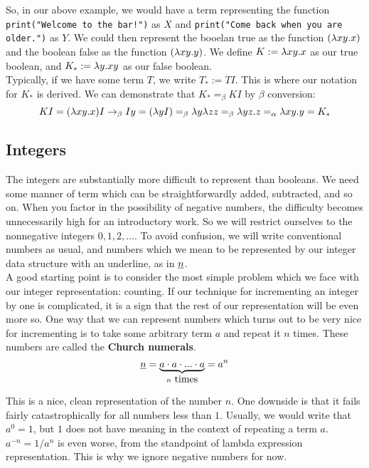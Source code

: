 So, in our above example, we would have a term representing the function \texttt{print("Welcome to the bar!")} as $X$ and \texttt{print("Come back when you are older.")} as $Y$. We could then represent the booelan true as the function $(\lambda xy.x)$ and the boolean false as the function $(\lambda xy.y)$. We define $K := \lambda xy.x$ as our true boolean, and $K_* := \lambda y.xy$ as our false boolean.\\

Typically, if we have some term $T$, we write $T_* := TI$. This is where our notation for $K_*$ is derived. We can demonstrate that $K_* =_\beta KI$ by $\beta$ conversion:
\begin{equation*}
  KI = (\lambda xy.x)I \rightarrow_\beta Iy = (\lambda yI) =_\beta \lambda y\lambda zz =_\beta \lambda yz.z =_\alpha \lambda xy.y = K_*
\end{equation*}

\subsection{Integers}
The integers are substantially more difficult to represent than booleans. We need some manner of term which can be straightforwardly added, subtracted, and so on. When you factor in the possibility of negative numbers, the difficulty becomes unnecessarily high for an introductory work. So we will restrict ourselves to the nonnegative integers $0,1,2,\ldots$. To avoid confusion, we will write conventional numbers as usual, and numbers which we mean to be represented by our integer data structure with an underline, as in $\uline{n}$.\\

A good starting point is to consider the most simple problem which we face with our integer representation: counting. If our technique for incrementing an integer by one is complicated, it is a sign that the rest of our representation will be even more so. One way that we can represent numbers which turns out to be very nice for incrementing is to take some arbitrary term $a$ and repeat it $n$ times. These numbers are called the \textbf{Church numerals}.\\

\begin{equation*}
  \uline{n} = \underbrace{a \cdot a \cdot ... \cdot a}_{n\hbox{ times}} = a^n
\end{equation*}

This is a nice, clean representation of the number $n$. One downside is that it fails fairly catastrophically for all numbers less than $1$. Usually, we would write that $a^0 = 1$, but $1$ does not have meaning in the context of repeating a term $a$. $a^{-n} = 1 / a^n$ is even worse, from the standpoint of lambda expression representation. This is why we ignore negative numbers for now.\\

